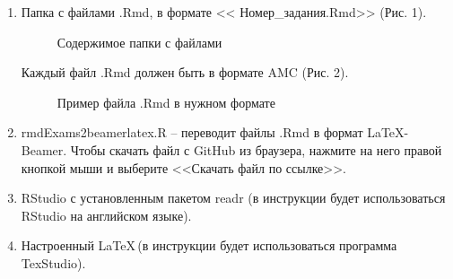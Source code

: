 \documentclass[11pt, a4paper]{extarticle}
\newcommand{\form}[1]{{\color{magenta} #1}}
\begin{document}
\begin{enumerate}
	\item Папка с файлами \form{.Rmd}, в формате <<\form{Номер\_задания.Rmd}>> (Рис. 1).
	\begin{figure}[h!]
		\centering
		\caption{Содержимое папки с файлами}
	\end{figure}

	Каждый файл \form{.Rmd} должен быть в формате \form{AMC} (Рис. 2).
	\begin{figure}[h!]
		\centering
		\caption{Пример файла .Rmd в нужном формате}
	\end{figure}

	\item \form{rmdExams2beamerlatex.R} – переводит файлы \form{.Rmd} в формат \LaTeX-Beamer. Чтобы скачать файл с GitHub из браузера, нажмите на него правой кнопкой мыши и выберите <<Скачать файл по ссылке>>.
	\item \form{RStudio} с установленным пакетом \form{readr} (в инструкции будет использоваться \form{RStudio} на английском языке).
	\item Настроенный \LaTeX \,(в инструкции будет использоваться программа \form{TexStudio}).
\end{enumerate}
\end{document}
